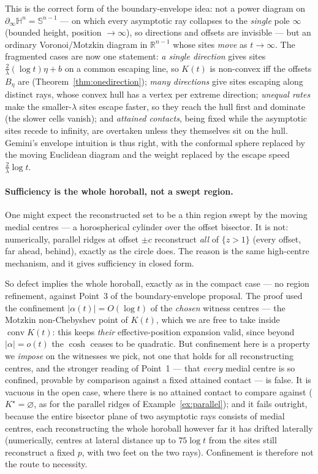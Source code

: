\documentclass[11pt]{article}
\theoremstyle{remark}
\newcommand{\R}{\mathbb{R}}
\begin{document}
This is the correct form of the boundary-envelope idea: not a power
diagram on $\partial_{\infty}\mathbb{H}^{n}=\mathbb{S}^{n-1}$ --- on
which every asymptotic ray collapses to the \emph{single} pole $\infty$
(bounded height, position $\to\infty$), so directions and offsets are
invisible --- but an ordinary Voronoi/Motzkin diagram in $\R^{n-1}$
whose sites \emph{move} as $t\to\infty$. The fragmented cases are now
one statement: \emph{a single direction} gives sites $\frac{2}{\lambda}
(\log t)\eta+b$ on a common escaping line, so $K(t)$ is non-convex iff
the offsets $B_{\eta}$ are (Theorem~\ref{thm:onedirection}); \emph{many
directions} give sites escaping along distinct rays, whose convex hull
has a vertex per extreme direction; \emph{unequal rates} make the
smaller-$\lambda$ sites escape faster, so they reach the hull first and
dominate (the slower cells vanish); and \emph{attained contacts}, being
fixed while the asymptotic sites recede to infinity, are overtaken
unless they themselves sit on the hull. Gemini's envelope intuition is
thus right, with the conformal sphere replaced by the moving Euclidean
diagram and the weight replaced by the escape speed
$\frac{2}{\lambda}\log t$.

\paragraph{Sufficiency is the whole horoball, not a swept region.}
One might expect the reconstructed set to be a thin region swept by the
moving medial centres --- a horospherical cylinder over the offset
bisector. It is not: numerically, parallel ridges at offset $\pm c$
reconstruct \emph{all} of $\{z>1\}$ (every offset, far ahead, behind),
exactly as the circle does. The reason is the same high-centre
mechanism, and it gives sufficiency in closed form.

So defect implies the whole horoball, exactly as in the compact case
--- no region refinement, against Point~3 of the boundary-envelope
proposal. The proof used the confinement $\lvert\alpha(t)\rvert=
O(\log t)$ of the \emph{chosen} witness centres --- the Motzkin
non-Chebyshev point of $K(t)$, which we are free to take inside
$\operatorname{conv}K(t)$: this keeps \emph{their} effective-position
expansion valid, since beyond $\lvert\alpha\rvert=o(t)$ the $\cosh$
ceases to be quadratic. But confinement here is a property we
\emph{impose} on the witnesses we pick, not one that holds for all
reconstructing centres, and the stronger reading of Point~1 --- that
\emph{every} medial centre is so confined, provable by comparison
against a fixed attained contact --- is false. It is vacuous in the
open case, where there is no attained contact to compare against
($K^{\star}=\varnothing$, as for the parallel ridges of
Example~\ref{ex:parallel}); and it fails outright, because the entire
bisector plane of two asymptotic rays consists of medial centres, each
reconstructing the whole horoball however far it has drifted laterally
(numerically, centres at lateral distance up to $75\log t$ from the
sites still reconstruct a fixed $p$, with two feet on the two rays).
Confinement is therefore not the route to necessity.
\end{document}
